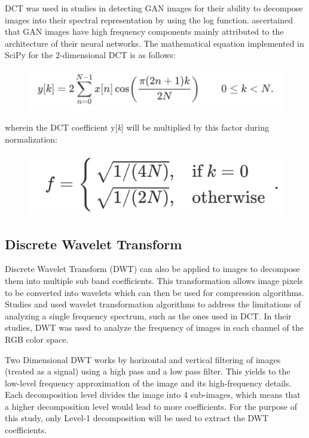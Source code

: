 \documentclass[journal]{./IEEE/IEEEtran}
\begin{document}
DCT was used in studies \cite{lev-freq-dct, fighting-dct} in detecting GAN images for their ability to decompose images into their spectral representation by using the log function. \cite{lev-freq-dct} ascertained that GAN images have high frequency components mainly attributed to the architecture of their neural networks. The mathematical equation implemented in SciPy for the 2-dimensional DCT is as follows:

\begin{figure}[!ht]
    \centering
    \includegraphics{imgs/formula.png}
\end{figure}

wherein the DCT coefficient y[\textit{k}] will be multiplied by this factor during normalization:

\begin{figure}[!ht]
    \centering
    \includegraphics{imgs/factor.png}
\end{figure}


\subsection{Discrete Wavelet Transform}
Discrete Wavelet Transform (DWT) can also be applied to images to decompose them into multiple sub band coefficients. This transformation allows image pixels to be converted into wavelets which can then be used for compression algorithms. Studies \cite{dwt} and \cite{dwt2} used wavelet transformation algorithms to address the limitations of analyzing a single frequency spectrum, such as the ones used in DCT. In their studies, DWT was used to analyze the frequency of images in each channel of the RGB color space.

Two Dimensional DWT works by horizontal and vertical filtering of images (treated as a signal) using a high pass and a low pass filter\cite{dwt-method}. This yields to the low-level frequency approximation of the image and its high-frequency details. Each decomposition level divides the image into 4 sub-images, which means that a higher decomposition level would lead to more coefficients. For the purpose of this study, only Level-1 decomposition will be used to extract the DWT coefficients.
\end{document}
